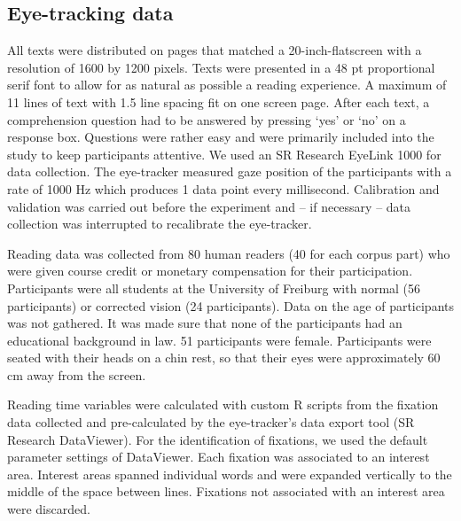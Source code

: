\documentclass[output=paper]{langsci/langscibook}
\begin{document}
\subsection{\label{wolfer:sec:2.2}Eye-tracking data}

All texts were distributed on pages that matched a 20-inch-flatscreen with a resolution of 1600 by 1200 pixels. Texts were presented in a 48 pt proportional serif font to allow for as natural as possible a reading experience. A maximum of 11 lines of text with 1.5 line spacing fit on one screen page. After each text, a comprehension question had to be answered by pressing ‘yes’ or ‘no’ on a response box. Questions were rather easy and were primarily included into the study to keep participants attentive. We used an SR Research EyeLink 1000 for data collection. The eye-tracker measured gaze position of the participants with a rate of 1000 Hz which produces 1 data point every millisecond. Calibration and validation was carried out before the experiment and – if necessary – data collection was interrupted to recalibrate the eye-tracker.

Reading data was collected from 80 human readers (40 for each corpus part) who were given course credit or monetary compensation for their participation. Participants were all students at the University of Freiburg with normal (56 participants) or corrected vision (24 participants). Data on the age of participants was not gathered. It was made sure that none of the participants had an educational background in law. 51 participants were female. Participants were seated with their heads on a chin rest, so that their eyes were approximately 60 cm away from the screen.

Reading time variables were calculated with custom R \citep{R2014} scripts from the fixation data collected and pre-calculated by the eye-tracker’s data export tool (SR Research DataViewer). For the identification of fixations, we used the default parameter settings of DataViewer. Each fixation was associated to an interest area. Interest areas spanned individual words and were expanded vertically to the middle of the space between lines. Fixations not associated with an interest area were discarded.
\end{document}
